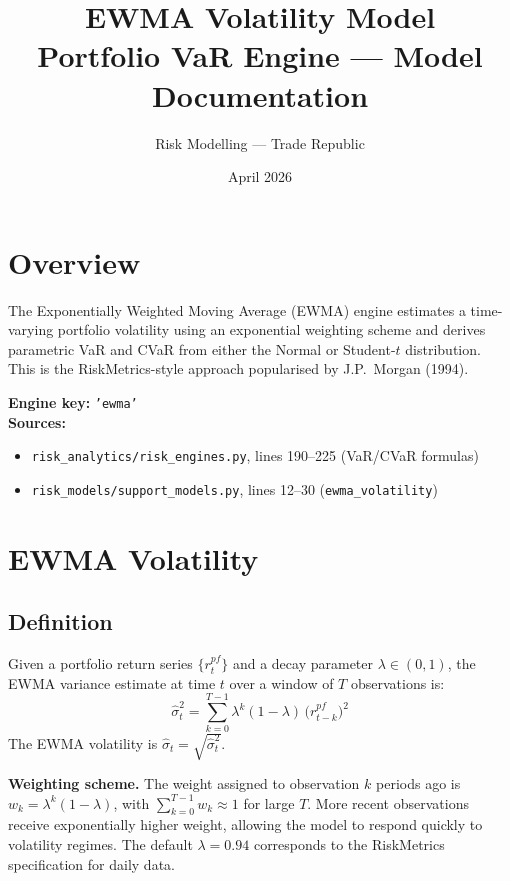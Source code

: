 \documentclass[11pt, a4paper]{article}
\title{\textbf{EWMA Volatility Model}\\[4pt]
\large Portfolio VaR Engine --- Model Documentation}
\author{Risk Modelling --- Trade Republic}
\date{April 2026}
\begin{document}
\maketitle

\section{Overview}

The Exponentially Weighted Moving Average (EWMA) engine estimates a
time-varying portfolio volatility using an exponential weighting scheme
and derives parametric VaR and CVaR from either the Normal or Student-$t$
distribution. This is the RiskMetrics-style approach popularised by
J.P.\ Morgan (1994).

\textbf{Engine key:} \texttt{'ewma'} \\
\textbf{Sources:}
\begin{itemize}
  \item \texttt{risk\_analytics/risk\_engines.py}, lines 190--225 (VaR/CVaR formulas)
  \item \texttt{risk\_models/support\_models.py}, lines 12--30 (\texttt{ewma\_volatility})
\end{itemize}

\section{EWMA Volatility}

\subsection{Definition}

Given a portfolio return series $\{r_t^{pf}\}$ and a decay parameter
$\lambda \in (0,1)$, the EWMA variance estimate at time $t$ over a window
of $T$ observations is:
\begin{equation}
\hat{\sigma}_t^2
= \sum_{k=0}^{T-1} \lambda^k (1 - \lambda)\, \bigl(r_{t-k}^{pf}\bigr)^2
\label{eq:ewma_var}
\end{equation}
The EWMA volatility is $\hat{\sigma}_t = \sqrt{\hat{\sigma}_t^2}$.

\textbf{Weighting scheme.} The weight assigned to observation $k$ periods
ago is $w_k = \lambda^k(1-\lambda)$, with $\sum_{k=0}^{T-1} w_k \approx 1$
for large $T$.  More recent observations receive exponentially higher weight,
allowing the model to respond quickly to volatility regimes. The default
$\lambda = 0.94$ corresponds to the RiskMetrics specification for daily data.
\end{document}
